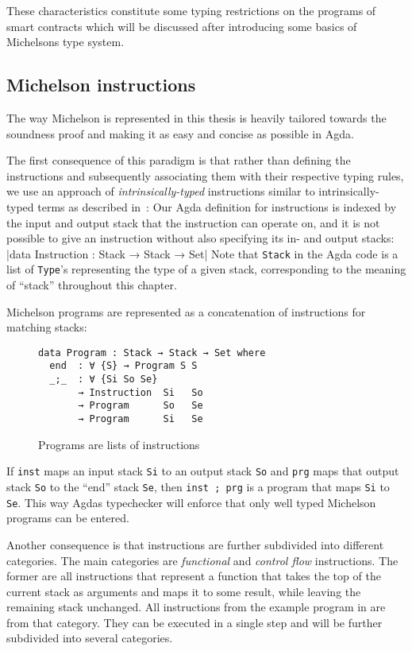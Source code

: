 These characteristics constitute some typing restrictions on the programs of smart contracts
which will be discussed after introducing some basics of Michelsons type system.

\subsection{Michelson instructions}\label{sec:instructions}

The way Michelson is represented in this thesis is heavily tailored towards
the soundness proof and making it as easy and concise as possible in Agda.

The first consequence of this paradigm is that rather than defining the instructions
and subsequently associating them with their respective typing rules,
we use an approach of \emph{intrinsically-typed} instructions similar to
intrinsically-typed terms as described in~\cite{plfa}:
Our Agda definition for instructions is indexed by the input and output stack
that the instruction can operate on, and it is not possible to give an instruction
without also specifying its in- and output stacks:
|data Instruction : Stack → Stack → Set|
Note that \verb/Stack/ in the Agda code is a list of \verb/Type/'s representing
the type of a given stack, corresponding to the meaning of ``stack'' throughout this chapter.

Michelson programs are represented as a concatenation of instructions for matching stacks:
\begin{figure}[tp]
\begin{verbatim}
data Program : Stack → Stack → Set where
  end  : ∀ {S} → Program S S
  _;_  : ∀ {Si So Se}
       → Instruction  Si   So
       → Program      So   Se
       → Program      Si   Se
\end{verbatim}
\caption{Programs are lists of instructions}
\label{Program}
\end{figure}
If \verb/inst/ maps an input stack \verb/Si/ to an output stack \verb/So/
and \verb/prg/ maps that output stack \verb/So/ to the ``end'' stack \verb/Se/,
then \verb/inst ; prg/ is a program that maps \verb/Si/ to \verb/Se/.
This way Agdas typechecker will enforce that only well typed Michelson programs can be entered.

Another consequence is that instructions are further subdivided into different categories.
The main categories are \emph{functional} and \emph{control flow} instructions.
The former are all instructions that represent a function that takes the top of the
current stack as arguments and maps it to some result, while leaving the remaining stack unchanged.
All instructions from the example program in  are from that category.
They can be executed in a single step and will be further subdivided into several categories.

